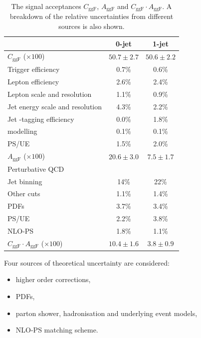 \begin{table}[t]
	\begin{tabular}{lc@{\hskip 0.2in}c}
		\toprule
		& 0-jet & 1-jet \\
		\midrule
		$C_{\text{ggF}}$ ($\times 100$) & $50.7\pm2.7$ & $50.6\pm2.2$ \\
		\quad Trigger efficiency              & 0.7\% & 0.6\% \\
		\quad Lepton efficiency               & 2.6\% & 2.4\% \\
		\quad Lepton \pt scale and resolution & 1.1\% & 0.9\% \\
		\quad Jet energy scale and resolution & 4.3\% & 2.2\% \\
		\quad Jet \Pbottom-tagging efficiency & 0.0\% & 1.8\% \\
		\quad \met modelling                  & 0.1\% & 0.1\% \\
		\quad PS/UE                           & 1.5\% & 2.0\% \\
		\cmidrule(lr){1-3}
		$A_{\text{ggF}}$ ($\times 100$) & $20.6\pm3.0$ & $7.5\pm1.7$ \\
		\quad Perturbative QCD \\
		\quad\quad Jet binning & 14\%  & 22\%  \\
		\quad\quad Other cuts  & 1.1\% & 1.4\% \\
		\quad PDFs             & 3.7\% & 3.4\% \\
		\quad PS/UE            & 2.2\% & 3.8\% \\
		\quad NLO-PS           & 1.8\% & 1.1\% \\
		\cmidrule(lr){1-3}
		$C_{\text{ggF}} \cdot A_{\text{ggF}}$ ($\times 100$) & $10.4\pm1.6$ & $3.8\pm0.9$ \\
		\bottomrule
	\end{tabular}
	\caption{The signal acceptances $C_{\text{ggF}}$, $A_{\text{ggF}}$ and $C_{\text{ggF}} 
	\cdot A_{\text{ggF}}$. A breakdown of the relative uncertainties from different sources 
	is also shown.}
	\label{tab:ggF:cggF_aggF}
\end{table}

\newpage
Four sources of theoretical uncertainty are considered:
\begin{itemize}[noitemsep,nolistsep]
	\item higher order corrections,
	\item PDFs,
	\item parton shower, hadronisation and underlying event models,
	\item NLO-PS matching scheme.
\end{itemize}

